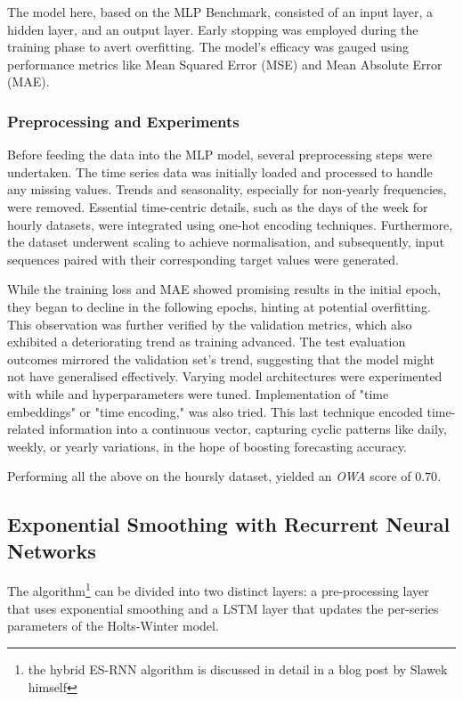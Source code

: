 \documentclass[conference]{IEEEtran}
\begin{document}
The model here, based on the MLP Benchmark\cite{mlp}, consisted of an input layer, a hidden layer, and an output layer. Early stopping was employed during the training phase to avert overfitting. The model's efficacy was gauged using performance metrics like Mean Squared Error (MSE) and Mean Absolute Error (MAE).

\subsubsection{Preprocessing and Experiments}

Before feeding the data into the MLP model, several preprocessing steps were undertaken. The time series data was initially loaded and processed to handle any missing values. Trends and seasonality, especially for non-yearly frequencies, were removed. Essential time-centric details, such as the days of the week for hourly datasets, were integrated using one-hot encoding techniques. Furthermore, the dataset underwent scaling to achieve normalisation, and subsequently, input sequences paired with their corresponding target values were generated.

While the training loss and MAE showed promising results in the initial epoch, they began to decline in the following epochs, hinting at potential overfitting. This observation was further verified by the validation metrics, which also exhibited a deteriorating trend as training advanced. The test evaluation outcomes mirrored the validation set's trend, suggesting that the model might not have generalised effectively. Varying model architectures were experimented with while and hyperparameters were tuned. Implementation of "time embeddings" or "time encoding," was also tried. This last technique encoded time-related information into a continuous vector, capturing cyclic patterns like daily, weekly, or yearly variations, in the hope of boosting forecasting accuracy.

Performing all the above on the hoursly dataset, yielded an \textit{OWA} score of $0.70$.

\subsection{Exponential Smoothing with Recurrent Neural Networks}

The algorithm\footnote{the hybrid ES-RNN algorithm is discussed in detail in a blog post by Slawek himself\cite{slawek}} can be divided into two distinct layers: a pre-processing layer that uses exponential smoothing and a LSTM layer that updates the per-series parameters of the Holts-Winter model.
\end{document}

